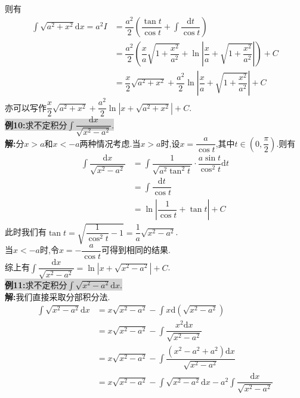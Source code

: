 \documentclass[a4paper,oneside]{ctexart}
\newcommand{\di}{\mathrm{d}}
\begin{document}
则有
$$\begin{aligned}
  \int{\sqrt{a^2+x^2}\di x} = a^2I &= \dfrac{a^2}{2}\left(\dfrac{\tan{t}}{\cos{t}}+\int{\dfrac{\di t}{\cos{t}}}\right) \\
                                   &= \dfrac{a^2}{2}\left(\dfrac{x}{a}\sqrt{1+\dfrac{x^2}{a^2}}+\ln{\left\lvert\dfrac{x}{a}+\sqrt{1+\dfrac{x^2}{a^2}}\right\rvert}\right)+C\\
                                   &= \dfrac{x}{2}\sqrt{a^2+x^2}+\dfrac{a^2}{2}\ln{\left\lvert\dfrac{x}{a}+\sqrt{1+\dfrac{x^2}{a^2}}\right\rvert}+C
\end{aligned}$$
亦可以写作$\dfrac{x}{2}\sqrt{a^2+x^2}+\dfrac{a^2}{2}\ln{\left\lvert x+\sqrt{a^2+x^2}\right\rvert}+C$.\\
\colorbox{lightgray}{\textbf{例10:}求不定积分$\int{\dfrac{\di x}{\sqrt{x^2-a^2}}}$.}\\
\textbf{解:}分$x>a$和$x<-a$两种情况考虑.当$x>a$时,设$x=\dfrac{a}{\cos{t}}$,其中$t\in \left(0,\dfrac{\pi}{2}\right)$.则有
$$\begin{aligned}
  \int{\dfrac{\di x}{\sqrt{x^2-a^2}}} &= \int{\dfrac{1}{\sqrt{a^2\tan^2{t}}}\cdot\dfrac{a\sin{t}}{\cos^2{t}}\di t} \\
                                      &= \int{\dfrac{\di t}{\cos{t}}} \\
                                      &= \ln{\left\lvert \dfrac{1}{\cos{t}}+\tan{t}\right\rvert}+C
\end{aligned}$$
此时我们有$\tan{t}=\sqrt{\dfrac{1}{\cos^2{t}}-1}=\dfrac{1}{a}\sqrt{x^2-a^2}$.\\
当$x<-a$时,令$x=-\dfrac{a}{\cos{t}}$可得到相同的结果.\\
综上有$\int{\dfrac{\di x}{\sqrt{x^2-a^2}}}=\ln\left\lvert x+\sqrt{x^2-a^2}\right\rvert+C$.\\
\colorbox{lightgray}{\textbf{例11:}求不定积分$\int{\sqrt{x^2-a^2}\di x}$.}\\
\textbf{解:}我们直接采取分部积分法.
$$\begin{aligned}
  \int{\sqrt{x^2-a^2}\di x} &= x\sqrt{x^2-a^2}-\int{x\di\left(\sqrt{x^2-a^2}\right)} \\
                            &= x\sqrt{x^2-a^2}-\int{\dfrac{x^2\di x}{\sqrt{x^2-a^2}}} \\
                            &= x\sqrt{x^2-a^2}-\int{\dfrac{\left(x^2-a^2+a^2\right)\di x}{\sqrt{x^2-a^2}}} \\
                            &= x\sqrt{x^2-a^2}-\int{\sqrt{x^2-a^2}\di x}-a^2\int{\dfrac{\di x}{\sqrt{x^2-a^2}}}
\end{aligned}$$
\end{document}
